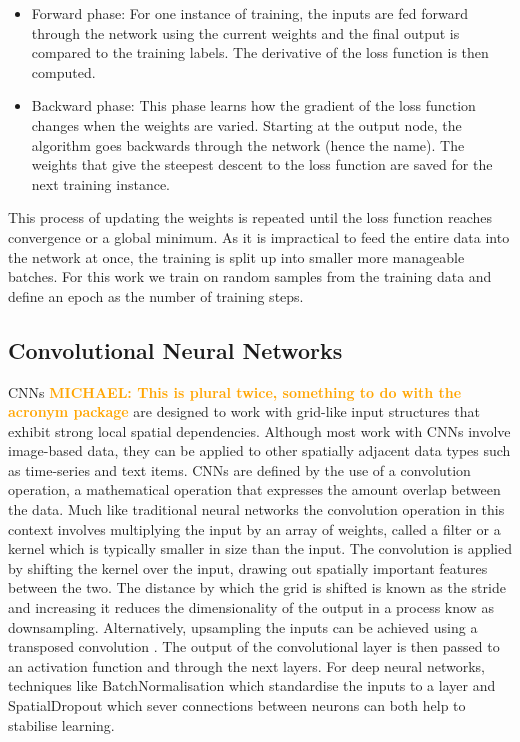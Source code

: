\documentclass[12pt]{iopart}
\newcommand{\michael}[1]{\textbf{\textcolor{orange}{MICHAEL: #1}}}
\begin{document}
\begin{itemize}
\item Forward phase: For one instance of training, the inputs are fed forward through the network using the current weights and the final output is compared to the training labels. The derivative of the loss function is then computed.
\item Backward phase: This phase learns how the gradient of the loss function changes when the weights are varied. Starting at the output node, the algorithm goes backwards through the network (hence the name). The weights that give the steepest descent to the loss function are saved for the next training instance.  
\end{itemize}
This process of updating the weights is repeated until the loss function reaches convergence or a global minimum. As it is impractical to feed the entire data into the network at once, the training is split up into smaller more manageable batches. For this work we train on random samples from the training data and define an epoch as the number of training steps.


\subsection{Convolutional Neural Networks}
%
\acp{CNN} \michael{This is plural twice, something to do with the acronym package} are designed to work with grid-like input structures that exhibit
strong local spatial dependencies. Although most work with \acp{CNN}
involve image-based data, they can be applied to other spatially adjacent data
types such as time-series and text items. \acp{CNN} are defined by the use of a
convolution operation, a mathematical operation that expresses the amount
overlap between the data. Much like traditional neural networks the convolution operation in this context involves multiplying the input by an array of weights, called a filter or a kernel which is typically smaller in size than the input. The convolution is applied by shifting the kernel over the input, drawing out spatially important features between the
two. The distance by which the grid is shifted is known as
the stride and increasing it reduces the dimensionality of the output in a process know as downsampling. Alternatively, upsampling the inputs can be achieved using a transposed convolution \cite{dumoulin2016guide}. The output of the convolutional layer is then passed to an activation function and through the next layers. For deep neural networks, techniques like BatchNormalisation \cite{ioffe2015batch} which standardise the inputs to a layer and SpatialDropout \cite{tompson2014efficient} which sever connections between neurons can both help to stabilise learning.  
\end{document}
